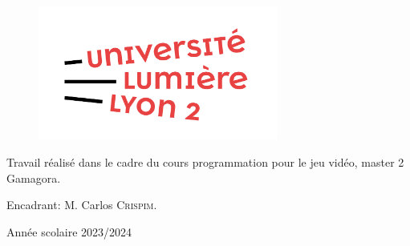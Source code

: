 \begin{titlepage}
    \maketitle
    \thispagestyle{empty} %
    \centering
     \vspace{5\baselineskip}
     
      \begin{figure}[!ht]
        \begin{center}
            \includegraphics[width=0.7\textwidth]{image/logo.png}
        \end{center}
    \end{figure}
    
    \vspace{5\baselineskip}
     
    Travail réalisé dans le cadre du cours programmation pour le jeu vidéo, master 2 Gamagora.

    \vspace{2\baselineskip}

    Encadrant: M. Carlos \textsc{Crispim}.

    \vspace{2\baselineskip}

    Année scolaire 2023/2024



\end{titlepage}
